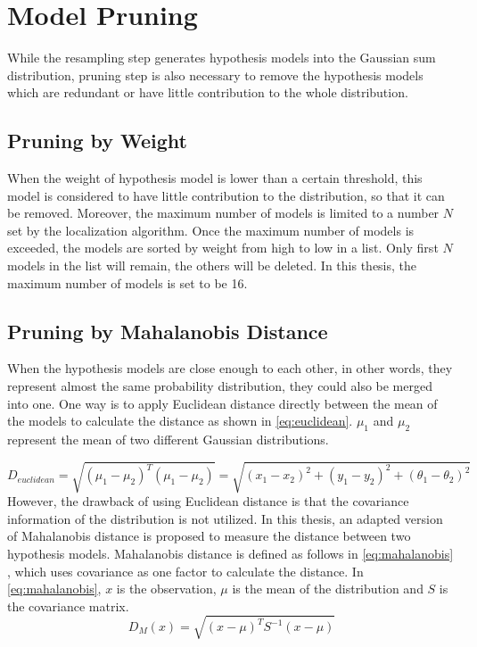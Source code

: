 \section{Model Pruning}\label{sec:pruning}
While the resampling step generates hypothesis models into the Gaussian sum distribution, pruning step is also necessary to remove the hypothesis models which are redundant or have little contribution to the whole distribution.

\subsection{Pruning by Weight}
\label{sub:Pruning by Weight}
When the weight of hypothesis model is lower than a certain threshold, this model is considered to have little contribution to the distribution, so that it can be removed. Moreover, the maximum number of models is limited to a number $N$ set by the localization algorithm. Once the maximum number of models is exceeded, the models are sorted by weight from high to low in a list. Only first $N$ models in the list will remain, the others will be deleted. In this thesis, the maximum number of models is set to be 16.

\subsection[Pruning by Mahalanobis Distance]{Pruning by Mahalanobis Distance \cite{de2000mahalanobis}}
\label{sub:Prunning Mahalanobis Distance}
When the hypothesis models are close enough to each other, in other words, they represent almost the same probability distribution, they could also be merged into one. One way is to apply Euclidean distance directly between the mean of the models to calculate the distance as shown in \autoref{eq:euclidean}. $\mu_1$ and $\mu_2$ represent the mean of two different Gaussian distributions.

\begin{equation}
\label{eq:euclidean}
D_{euclidean} = \sqrt{(\mu_1 - \mu_2)^T(\mu_1 - \mu_2)}= \sqrt{(x_{1}-x_{2})^2 + (y_{1}-y_{2})^2 + (\theta_{1}-\theta_{2})^2}
\end{equation}
However, the drawback of using Euclidean distance is that the covariance information of the distribution is not utilized. In this thesis, an adapted version of Mahalanobis distance is proposed to measure the distance between two hypothesis models. Mahalanobis distance is defined as follows in \autoref{eq:mahalanobis} \cite{de2000mahalanobis}, which uses covariance as one factor to calculate the distance. In \autoref{eq:mahalanobis}, $x$ is the observation, $\mu$ is the mean of the distribution and $S$ is the covariance matrix.
\begin{equation}
\label{eq:mahalanobis}
D_M(x) = \sqrt{(x - \mu)^T S^{-1} (x-\mu)}
\end{equation}

